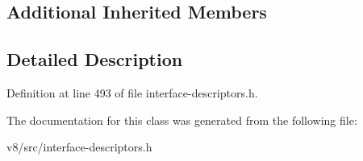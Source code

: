 \subsection*{Additional Inherited Members}


\subsection{Detailed Description}


Definition at line 493 of file interface-\/descriptors.\+h.



The documentation for this class was generated from the following file\+:\begin{DoxyCompactItemize}
\item 
v8/src/interface-\/descriptors.\+h\end{DoxyCompactItemize}
